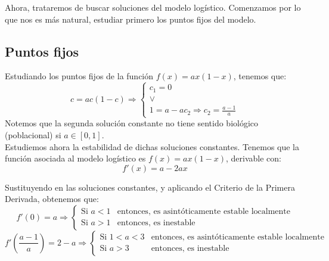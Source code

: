 Ahora, trataremos de buscar soluciones del modelo logístico. Comenzamos por lo que nos es más natural, estudiar primero los puntos fijos del modelo.
\subsection{Puntos fijos}
Estudiando los puntos fijos de la función $f(x) = ax(1-x)$, tenemos que:
\begin{equation*}
    c = ac(1-c) \Longrightarrow
    \left\{\begin{array}{l}
        c_1=0\\
        \lor \\
        1 = a-ac_2 \Longrightarrow c_2 = \frac{a-1}{a}
    \end{array}\right.
\end{equation*}
Notemos que la segunda solución constante no tiene sentido biológico (poblacional) si $a\in [0,1]$.\\

Estudiemos ahora la estabilidad de dichas soluciones constantes. Tenemos que la función asociada al modelo logístico es $f(x) = ax(1-x)$, derivable con:
\begin{equation*}
    f'(x) = a-2ax
\end{equation*}

Sustituyendo en las soluciones constantes, y aplicando el Criterio de la Primera Derivada, obtenemos que:
\begin{equation*}
    f'(0) = a \Longrightarrow \left\{ \begin{array}{ll}
        \text{Si\ } a<1 & \text{entonces, es asintóticamente estable localmente} \\
        \text{Si\ } a>1 & \text{entonces, es inestable}
    \end{array} \right.
\end{equation*}
\begin{equation*}
    f'\left(\dfrac{a-1}{a}\right) = 2-a \Rightarrow \left\{ \begin{array}{ll}
         \text{Si\ } 1 < a < 3 & \text{entonces, es asintóticamente estable localmente} \\
         \text{Si\ } a > 3 & \text{entonces, es inestable}
    \end{array}\right.
\end{equation*}

